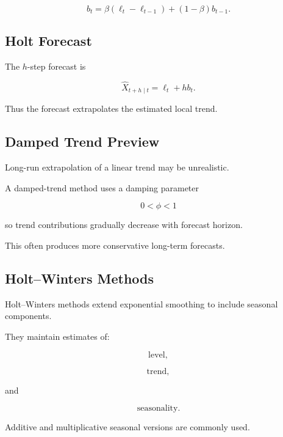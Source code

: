 \[
\boxed{
b_t
=
\beta
(
\ell_t-\ell_{t-1}
)
+
(1-\beta)b_{t-1}.
}
\]

\subsection{Holt Forecast}
\label{subsec:holt-forecast}

The \(h\)-step forecast is

\[
\boxed{
\widehat{X}_{t+h\mid t}
=
\ell_t
+
hb_t.
}
\]

Thus the forecast extrapolates the estimated local trend.

\subsection{Damped Trend Preview}
\label{subsec:damped-trend}

Long-run extrapolation of a linear trend may be unrealistic.

A damped-trend method uses a damping parameter

\[
0<\phi<1
\]

so trend contributions gradually decrease with forecast horizon.

This often produces more conservative long-term forecasts.

\subsection{Holt--Winters Methods}
\label{subsec:holt-winters}

Holt--Winters methods extend exponential smoothing to include seasonal
components.

They maintain estimates of:

\[
\boxed{
\text{level},
}
\]

\[
\boxed{
\text{trend},
}
\]

and

\[
\boxed{
\text{seasonality}.
}
\]

Additive and multiplicative seasonal versions are commonly used.

